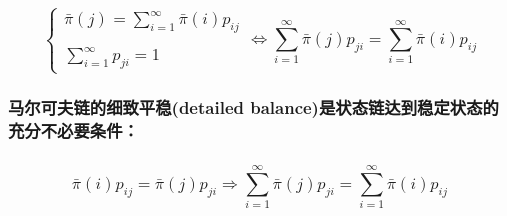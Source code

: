\documentclass[11pt]{article}
\begin{document}
\subsubsection{\texorpdfstring{\[
\begin{cases}
\bar\pi(j)=\sum_{i=1}^{\infty} \bar\pi(i)p_{ij}\\
\quad\\
\sum_{i=1}^{\infty} p_{ji}=1
\end{cases}
\Leftrightarrow
\sum_{i=1}^{\infty} \bar\pi(j)p_{ji}=\sum_{i=1}^{\infty} \bar\pi(i)p_{ij}\]}{
\textbackslash{}begin\{cases\}
\textbackslash{}bar\textbackslash{}pi(j)=\textbackslash{}sum\_\{i=1\}\^{}\{\textbackslash{}infty\} \textbackslash{}bar\textbackslash{}pi(i)p\_\{ij\}\textbackslash{}\textbackslash{}
\textbackslash{}quad\textbackslash{}\textbackslash{}
\textbackslash{}sum\_\{i=1\}\^{}\{\textbackslash{}infty\} p\_\{ji\}=1
\textbackslash{}end\{cases\}
\textbackslash{}Leftrightarrow
\textbackslash{}sum\_\{i=1\}\^{}\{\textbackslash{}infty\} \textbackslash{}bar\textbackslash{}pi(j)p\_\{ji\}=\textbackslash{}sum\_\{i=1\}\^{}\{\textbackslash{}infty\} \textbackslash{}bar\textbackslash{}pi(i)p\_\{ij\}}}\label{begincasesbarpijsum_i1infty-barpiip_ijquadsum_i1infty-p_ji1endcasesleftrightarrowsum_i1infty-barpijp_jisum_i1infty-barpiip_ij}

\subsubsection{马尔可夫链的细致平稳(detailed
balance)是状态链达到稳定状态的充分不必要条件：}\label{ux9a6cux5c14ux53efux592bux94feux7684ux7ec6ux81f4ux5e73ux7a33detailed-balanceux662fux72b6ux6001ux94feux8fbeux5230ux7a33ux5b9aux72b6ux6001ux7684ux5145ux5206ux4e0dux5fc5ux8981ux6761ux4ef6}

\subsubsection{\texorpdfstring{\[\bar\pi(i)p_{ij}=\bar\pi(j)p_{ji}
\Rightarrow
\sum_{i=1}^{\infty} \bar\pi(j)p_{ji}=\sum_{i=1}^{\infty} \bar\pi(i)p_{ij}
\]}{\textbackslash{}bar\textbackslash{}pi(i)p\_\{ij\}=\textbackslash{}bar\textbackslash{}pi(j)p\_\{ji\}
\textbackslash{}Rightarrow
\textbackslash{}sum\_\{i=1\}\^{}\{\textbackslash{}infty\} \textbackslash{}bar\textbackslash{}pi(j)p\_\{ji\}=\textbackslash{}sum\_\{i=1\}\^{}\{\textbackslash{}infty\} \textbackslash{}bar\textbackslash{}pi(i)p\_\{ij\}
}}\label{barpiip_ijbarpijp_jirightarrowsum_i1infty-barpijp_jisum_i1infty-barpiip_ij}
\end{document}
